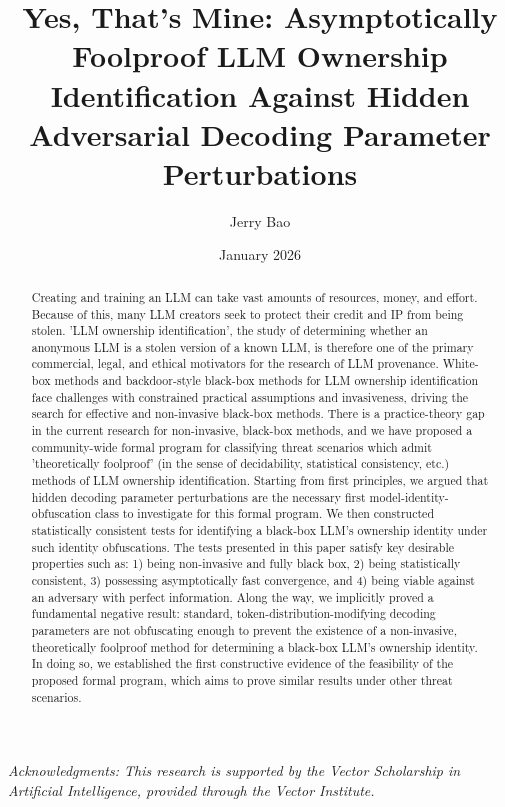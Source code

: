 \documentclass{article}
\title{Yes, That's Mine: Asymptotically Foolproof LLM Ownership Identification Against Hidden Adversarial Decoding Parameter Perturbations}
\author{Jerry Bao}
\date{January 2026}
\begin{document}
\maketitle

\vspace{-0.5em}
\begin{center}
\small
\textit{Acknowledgments: This research is supported by the Vector Scholarship in Artificial Intelligence, provided through the Vector Institute.}
\end{center}

\begin{abstract}
\small
Creating and training an LLM can take vast amounts of resources, money, and effort. Because of this, many LLM creators seek to protect their credit and IP from being stolen. 'LLM ownership identification', the study of determining whether an anonymous LLM is a stolen version of a known LLM, is therefore one of the primary commercial, legal, and ethical motivators for the research of LLM provenance. White-box methods and backdoor-style black-box methods for LLM ownership identification face challenges with constrained practical assumptions and invasiveness, driving the search for effective and non-invasive black-box methods. There is a practice-theory gap in the current research for non-invasive, black-box methods, and we have proposed a community-wide formal program for classifying threat scenarios which admit 'theoretically foolproof' (in the sense of decidability, statistical consistency, etc.) methods of LLM ownership identification. Starting from first principles, we argued that hidden decoding parameter perturbations are the necessary first model-identity-obfuscation class to investigate for this formal program. We then constructed statistically consistent tests for identifying a black-box LLM's ownership identity under such identity obfuscations. The tests presented in this paper satisfy key desirable properties such as: 1) being non-invasive and fully black box, 2) being statistically consistent, 3) possessing asymptotically fast convergence, and 4) being viable against an adversary with perfect information. Along the way, we implicitly proved a fundamental negative result: standard, token-distribution-modifying decoding parameters are not obfuscating enough to prevent the existence of a non-invasive, theoretically foolproof method for determining a black-box LLM’s ownership identity. In doing so, we established the first constructive evidence of the feasibility of the proposed formal program, which aims to prove similar results under other threat scenarios.
\end{abstract}
\end{document}
